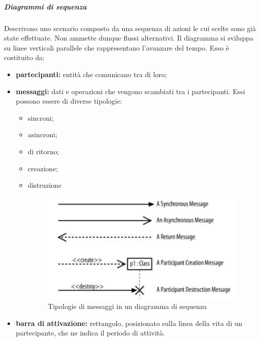 \subparagraph*{Diagrammi di sequenza} Descrivono uno scenario composto da una sequenza di azioni le cui scelte sono già state effettuate. Non ammette dunque flussi alternativi. Il diagramma si sviluppa su linee verticali parallele che rappresentano l'avanzare del tempo. Esso è costituito da:
\begin{itemize}
	\item \textbf{partecipanti:} entità che comunicano tra di loro;
	\item \textbf{messaggi:} dati e operazioni che vengono scambiati tra i partecipanti. Essi possono essere di diverse tipologie:
	\begin{itemize}
		\item sincroni;
		\item asincroni;
		\item di ritorno;
		\item creazione;
		\item distruzione
	\begin{figure}[h!]
		\caption{Tipologie di messaggi in un diagramma di sequenza}
		\centering
		\includegraphics[width=\textwidth]{res/img/diagrammiDiSequenza.png}
	\end{figure}
	\end{itemize}
	\item \textbf{barra di attivazione:} rettangolo, posizionato sulla linea della vita di un partecipante, che ne indica il periodo di attività.
\end{itemize}

